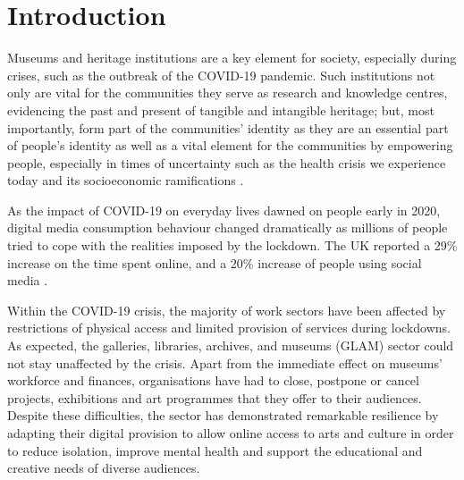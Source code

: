 \documentclass{egpubl}
\begin{document}
\section{Introduction}
Museums and heritage institutions are a key element for society, especially during crises, such as the outbreak of the COVID-19 pandemic. Such institutions not only are vital for the communities they serve as research and knowledge centres, evidencing the past and present of tangible and intangible heritage; but, most importantly, form part of the communities' identity as they are an essential part of people's identity as well as a vital element for the communities by empowering people, especially in times of uncertainty such as the health crisis we experience today and its socioeconomic ramifications \cite{ICOM:2020}.

As the impact of COVID-19 on everyday lives dawned on people early in 2020, digital media consumption behaviour changed dramatically as millions of people tried to cope with the realities imposed by the lockdown. The UK reported a 29\% increase on the time spent online, and a 20\% increase of people using social media \cite{ofcom:2020}. 

Within the COVID-19 crisis, the majority of work sectors have been affected by restrictions of physical access and limited provision of services during lockdowns. As expected, the galleries, libraries, archives, and museums (GLAM) sector could not stay unaffected by the crisis. Apart from the immediate effect on museums' workforce and finances, organisations have had to close, postpone or cancel projects, exhibitions and art programmes that they offer to their audiences. Despite these difficulties, the sector has demonstrated remarkable resilience by adapting their digital provision to allow online access to arts and culture in order to reduce isolation, improve mental health and support the educational and creative needs of diverse audiences.
\end{document}
